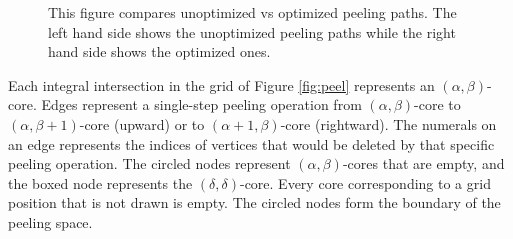 \begin{figure}%
    \centering
    \qquad
    \caption{This figure compares unoptimized vs optimized peeling paths. The left hand side shows the unoptimized peeling paths while the right hand side shows the optimized ones.}%
    \label{fig:peelspace}%
\end{figure}

Each integral intersection in the grid of Figure \ref{fig:peel} represents an $(\alpha,\beta)$-core. Edges represent a single-step peeling operation from $(\alpha,\beta)$-core to $(\alpha,\beta+1)$-core (upward) or to $(\alpha+1,\beta)$-core (rightward). The numerals on an edge represents the indices of vertices that would be deleted by that specific peeling operation. The circled nodes represent $(\alpha,\beta)$-cores that are empty, and the boxed node represents the $(\delta,\delta)$-core. Every core corresponding to a grid position that is not drawn is empty. The circled nodes form the boundary of the peeling space.

